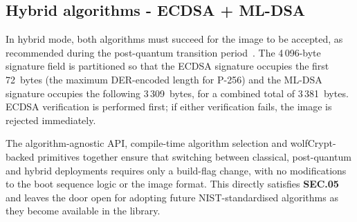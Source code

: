 \subsection{Hybrid algorithms - ECDSA + ML-DSA}

In hybrid mode, both algorithms must succeed for the image to be accepted, as recommended during the post-quantum transition period~\cite{bsi_crypto_key_length}. The 4\,096-byte signature field is partitioned so that the ECDSA signature occupies the first 72~bytes (the maximum DER-encoded length for P-256) and the ML-DSA signature occupies the following 3\,309~bytes, for a combined total of 3\,381~bytes. ECDSA verification is performed first; if either verification fails, the image is rejected immediately.

The algorithm-agnostic API, compile-time algorithm selection and wolfCrypt-backed primitives together ensure that switching between classical, post-quantum and hybrid deployments requires only a build-flag change, with no modifications to the boot sequence logic or the image format. This directly satisfies \textbf{SEC.05} and leaves the door open for adopting future NIST-standardised algorithms as they become available in the library.